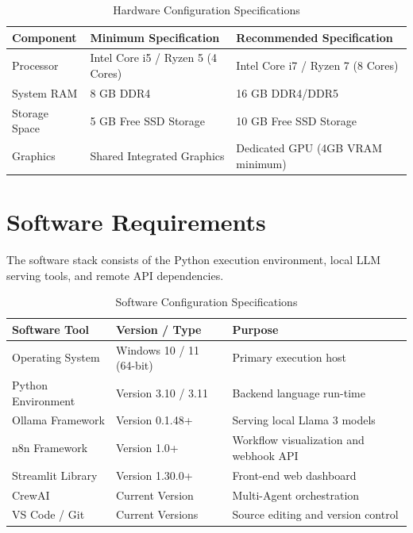 \documentclass[12pt,a4paper]{report}
\begin{document}
\begin{table}[h]
\centering
\begin{tabular}{|l|l|l|}
\hline
\textbf{Component} & \textbf{Minimum Specification} & \textbf{Recommended Specification} \\ \hline
Processor & Intel Core i5 / Ryzen 5 (4 Cores) & Intel Core i7 / Ryzen 7 (8 Cores) \\ \hline
System RAM & 8 GB DDR4 & 16 GB DDR4/DDR5 \\ \hline
Storage Space & 5 GB Free SSD Storage & 10 GB Free SSD Storage \\ \hline
Graphics & Shared Integrated Graphics & Dedicated GPU (4GB VRAM minimum) \\ \hline
\end{tabular}
\caption{Hardware Configuration Specifications}
\end{table}

\section{Software Requirements}
The software stack consists of the Python execution environment, local LLM serving tools, and remote API dependencies.

\begin{table}[h]
\centering
\begin{tabular}{|l|l|l|}
\hline
\textbf{Software Tool} & \textbf{Version / Type} & \textbf{Purpose} \\ \hline
Operating System & Windows 10 / 11 (64-bit) & Primary execution host \\ \hline
Python Environment & Version 3.10 / 3.11 & Backend language run-time \\ \hline
Ollama Framework & Version 0.1.48+ & Serving local Llama 3 models \\ \hline
n8n Framework & Version 1.0+ & Workflow visualization and webhook API \\ \hline
Streamlit Library & Version 1.30.0+ & Front-end web dashboard \\ \hline
CrewAI & Current Version & Multi-Agent orchestration \\ \hline
VS Code / Git & Current Versions & Source editing and version control \\ \hline
\end{tabular}
\caption{Software Configuration Specifications}
\end{table}

\end{document}
